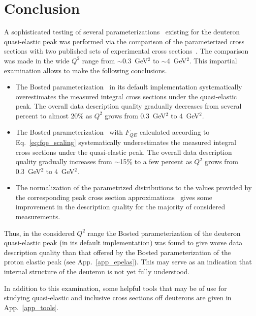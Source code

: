 \newpage
\chapter{Conclusion}
\mbox{}\vspace{-\baselineskip}

A sophisticated testing of several parameterizations~\cite{Bosted_fit,Bosted:2007xd,Durand:1961zz,Kocevar:1967} existing for the deuteron quasi-elastic peak was performed via the comparison of the parameterized cross sections with two published sets of experimental cross sections~\cite{Hanson:1973vf,Rock:1991jy,Rock_SLAC}. The comparison was made in the wide $Q^{2}$ range from $\sim$0.3~GeV$^{2}$ to $\sim$4~GeV$^{2}$. This impartial examination allows to make the following conclusions.


\begin{itemize}

\item The Bosted parameterization~\cite{Bosted_fit,Bosted:2007xd} in its default implementation systematically overestimates the measured integral cross sections under the quasi-elastic peak. The overall data description quality gradually decreases from several percent to almost 20\% as $Q^2$ grows from 0.3~GeV$^{2}$ to 4~GeV$^{2}$.

\item The Bosted parameterization~\cite{Bosted_fit,Bosted:2007xd} with $F_{QE}$ calculated according to Eq.~\eqref{eq:fqe_scaling} systematically underestimates the measured integral cross sections under the quasi-elastic peak. The overall data description quality gradually increases from $\sim$15\% to a few percent as $Q^2$ grows from 0.3~GeV$^{2}$ to 4~GeV$^{2}$.

\item The normalization of the parametrized distributions to the values provided by the corresponding peak cross section approximations~\cite{Durand:1961zz,Kocevar:1967} gives some improvement in the description quality for the majority of considered measurements.


\end{itemize}


 
Thus, in the considered $Q^{2}$ range the Bosted parameterization of the deuteron quasi-elastic peak (in its default implementation) was found to give worse data description quality than that offered by the Bosted parameterization of the proton elastic peak (see App.~\ref{app_epelas}). This may serve as an indication that internal structure of the deuteron is not yet fully understood. 



In addition to this examination, some helpful tools that may be of use for studying quasi-elastic and inclusive cross sections off deuterons are given in App.~\ref{app_tools}.



